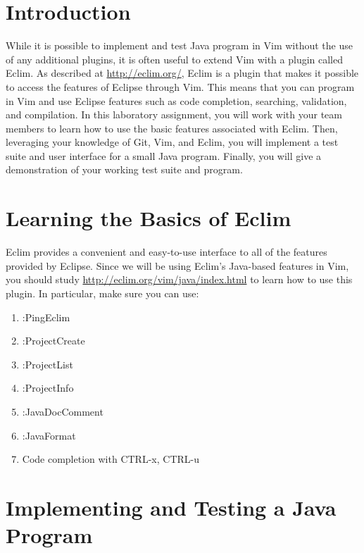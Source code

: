 

\usepackage[compact]{titlesec}



\section*{Introduction}

While it is possible to implement and test Java program in Vim without the use of any additional plugins, it is often
useful to extend Vim with a plugin called Eclim.  As described at \url{http://eclim.org/}, Eclim is a plugin that makes
it possible to access the features of Eclipse through Vim.  This means that you can program in Vim and use Eclipse
features such as code completion, searching, validation, and compilation. In this laboratory assignment, you will work
with your team members to learn how to use the basic features associated with Eclim.  Then, leveraging your knowledge of
Git, Vim, and Eclim, you will implement a test suite and user interface for a small Java program.  Finally, you will 
give a demonstration of your working test suite and program.

\section*{Learning the Basics of Eclim}

Eclim provides a convenient and easy-to-use interface to all of the features provided by Eclipse.  Since we will be
using Eclim's Java-based features in Vim, you should study \url{http://eclim.org/vim/java/index.html} to learn how to
use this plugin.  In particular, make sure you can use:

\begin{enumerate}
	\item :PingEclim
	\item :ProjectCreate
	\item :ProjectList
	\item :ProjectInfo
	\item :JavaDocComment
	\item :JavaFormat
	\item Code completion with CTRL-x, CTRL-u 
\end{enumerate}

\section*{Implementing and Testing a Java Program}

